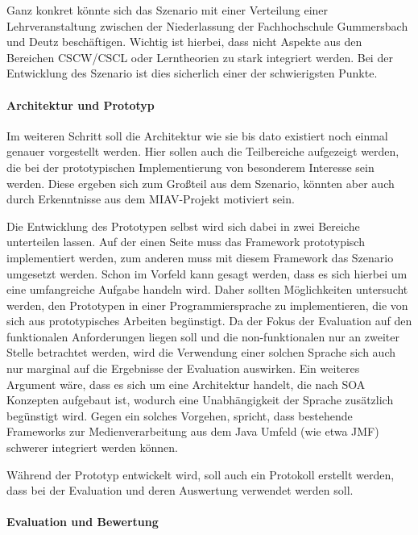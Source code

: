 \documentclass[12pt,headsepline,a4paper,bibtotoc,liststotoc,DIV12,BCOR12mm]{scrartcl}
\begin{document}
  Ganz konkret könnte sich das Szenario mit einer Verteilung einer Lehrveranstaltung zwischen der Niederlassung der Fachhochschule Gummersbach und Deutz beschäftigen. Wichtig ist hierbei, dass nicht Aspekte aus den Bereichen CSCW/CSCL oder Lerntheorien zu stark integriert werden. Bei der Entwicklung des Szenario ist dies sicherlich einer der schwierigsten Punkte.


\paragraph{Architektur und Prototyp} %
\label{par:architektur_und_prototyp}

  Im weiteren Schritt soll die Architektur wie sie bis dato existiert noch einmal genauer vorgestellt werden. Hier sollen auch die Teilbereiche aufgezeigt werden, die bei der prototypischen Implementierung von besonderem Interesse sein werden. Diese ergeben sich zum Großteil aus dem Szenario, könnten aber auch durch Erkenntnisse aus dem MIAV-Projekt motiviert sein.
  
  Die Entwicklung des Prototypen selbst wird sich dabei in zwei Bereiche unterteilen lassen. Auf der einen Seite muss das Framework prototypisch implementiert werden, zum anderen muss mit diesem Framework das Szenario umgesetzt werden. Schon im Vorfeld kann gesagt werden, dass es sich hierbei um eine umfangreiche Aufgabe handeln wird. Daher sollten Möglichkeiten untersucht werden, den Prototypen in einer Programmiersprache zu implementieren, die von sich aus prototypisches Arbeiten begünstigt. Da der Fokus der Evaluation auf den funktionalen Anforderungen liegen soll und die non-funktionalen nur an zweiter Stelle betrachtet werden, wird die Verwendung einer solchen Sprache sich auch nur marginal auf die Ergebnisse der Evaluation auswirken. Ein weiteres Argument wäre, dass es sich um eine Architektur handelt, die nach SOA Konzepten aufgebaut ist, wodurch eine Unabhängigkeit der Sprache zusätzlich begünstigt wird. Gegen ein solches Vorgehen, spricht, dass bestehende Frameworks zur Medienverarbeitung aus dem Java Umfeld (wie etwa JMF) schwerer integriert werden können.
  
  Während der Prototyp entwickelt wird, soll auch ein Protokoll erstellt werden, dass bei der Evaluation und deren Auswertung verwendet werden soll.
  

\paragraph{Evaluation und Bewertung} %
\label{par:evaluation_und_bewertung}
\end{document}
